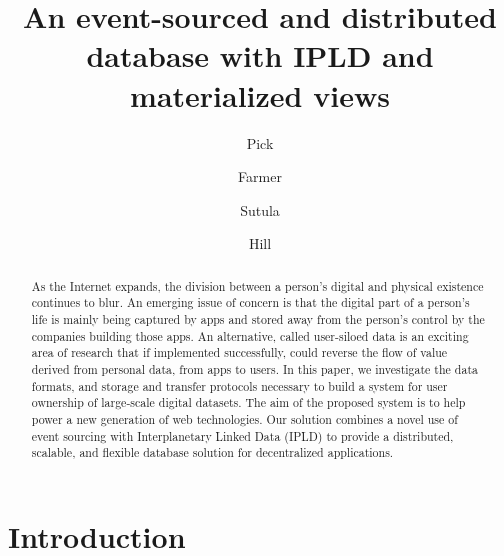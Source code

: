 \documentclass{comjnl}
\begin{document}
\pagecolor{white}


\title[An event-sourced and distributed database with IPLD and materialized views]{An event-sourced and distributed database with IPLD and materialized views}
\author{Pick}
\author{Farmer}
\author{Sutula}
\author{Hill}
 






\begin{abstract}
As the Internet expands, the division between a person's digital and physical existence continues to blur. An emerging issue of concern is that the digital part of a person's life is mainly being captured by apps and stored away from the person’s control by the companies building those apps. An alternative, called user-siloed data is an exciting area of research that if implemented successfully, could reverse the flow of value derived from personal data, from apps to users. In this paper, we investigate the data formats, and storage and transfer protocols necessary to build a system for user ownership of large-scale digital datasets. The aim of the proposed system is to help power a new generation of web technologies. Our solution combines a novel use of event sourcing with Interplanetary Linked Data (IPLD) to provide a distributed, scalable, and flexible database solution for decentralized applications.
\end{abstract}

\maketitle


\section{Introduction}
\end{document}
